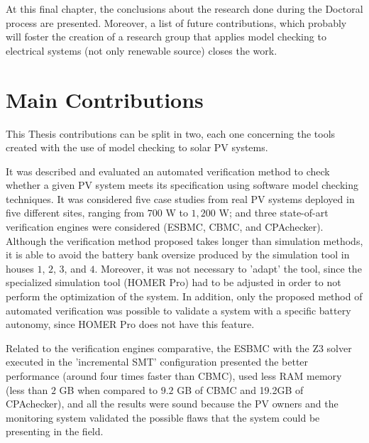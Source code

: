 At this final chapter, the conclusions about the research done during the Doctoral process are presented. Moreover, a list of future contributions, which probably will foster the creation of a research group that applies model checking to electrical systems (not only renewable source) closes the work.

\section{Main Contributions}

This Thesis contributions can be split in two, each one concerning the tools created with the use of model checking to solar PV systems.

It was described and evaluated an automated verification method to check whether a given PV system meets its specification using software model checking techniques. It was considered five case studies from real PV systems deployed in five different sites, ranging from $700$ W to $1,200$ W; and three state-of-art verification engines were considered (ESBMC, CBMC, and CPAchecker). Although the verification method proposed takes longer than simulation methods, it is able to avoid the battery bank oversize produced by the simulation tool in houses $1$, $2$, $3$, and $4$. Moreover, it was not necessary to 'adapt' the tool, since the specialized simulation tool (HOMER Pro) had to be adjusted in order to not perform the optimization of the system. In addition, only the proposed method of automated verification was possible to validate a system with a specific battery autonomy, since HOMER Pro does not have this feature.

Related to the verification engines comparative, the ESBMC with the Z3 solver executed in the 'incremental SMT' configuration presented the better performance (around four times faster than CBMC), used less RAM memory (less than $2$ GB when compared to $9.2$ GB of CBMC and 19.2GB of CPAchecker), and all the results were sound because the PV owners and the monitoring system validated the possible flaws that the system could be presenting in the field.

